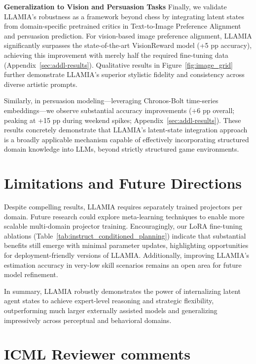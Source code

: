 \documentclass{article}
\theoremstyle{plain}
\theoremstyle{definition}
\theoremstyle{remark}
\begin{document}
\textbf{Generalization to Vision and Persuasion Tasks}
\label{sec:cross_domain}
Finally, we validate LLAMIA’s robustness as a framework beyond chess by integrating latent states from domain-specific pretrained critics in Text-to-Image Preference Alignment and persuasion prediction. For vision-based image preference alignment, LLAMIA significantly surpasses the state-of-the-art VisionReward model (+5 pp accuracy), achieving this improvement with merely half the required fine-tuning data (Appendix~\ref{sec:addl-results}). Qualitative results in Figure~\ref{fig:image_grid} further demonstrate LLAMIA’s superior stylistic fidelity and consistency across diverse artistic prompts.

Similarly, in persuasion modeling—leveraging Chronos-Bolt time-series embeddings—we observe substantial accuracy improvements (+6 pp overall; peaking at +15 pp during weekend spikes; Appendix~\ref{sec:addl-results}). These results concretely demonstrate that LLAMIA’s latent-state integration approach is a broadly applicable mechanism capable of effectively incorporating structured domain knowledge into LLMs, beyond strictly structured game environments.

\section{Limitations and Future Directions}
\label{sec:limitations_future}

Despite compelling results, LLAMIA requires separately trained projectors per domain. Future research could explore meta-learning techniques to enable more scalable multi-domain projector training. Encouragingly, our LoRA fine-tuning ablations (Table~\ref{tab:instruct_conditioned_planning}) indicate that substantial benefits still emerge with minimal parameter updates, highlighting opportunities for deployment-friendly versions of LLAMIA. Additionally, improving LLAMIA’s estimation accuracy in very-low skill scenarios remains an open area for future model refinement.

In summary, LLAMIA robustly demonstrates the power of internalizing latent agent states to achieve expert-level reasoning and strategic flexibility, outperforming much larger externally assisted models and generalizing impressively across perceptual and behavioral domains.





\section{ICML Reviewer comments}
\end{document}
